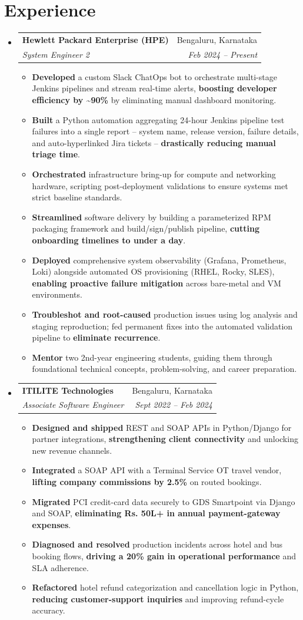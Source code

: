 \documentclass[a4paper,11pt]{article}
\makeatletter
\newcommand{\resumeItemWithoutTitle}[1]{
  \item\small{
    {#1 \vspace{-2pt}}
  }
}
\newcommand{\resumeSubheading}[4]{
  \vspace{-1pt}\item
    \begin{tabular*}{0.97\textwidth}{l@{\extracolsep{\fill}}r}
      \textbf{#1} & #2 \\
      \textit{#3} & \textit{#4} \\
    \end{tabular*}\vspace{-5pt}
}
\newcommand{\resumeSubHeadingListStart}{\begin{itemize}[leftmargin=*]}
\newcommand{\resumeSubHeadingListEnd}{\end{itemize}}
\newcommand{\resumeItemListStart}{\begin{itemize}}
\newcommand{\resumeItemListEnd}{\end{itemize}\vspace{-5pt}}
\makeatother
\begin{document}
\section{Experience}
  \resumeSubHeadingListStart
    \resumeSubheading
      {Hewlett Packard Enterprise (HPE)}{Bengaluru, Karnataka}
      {System Engineer 2}{Feb 2024 -- Present}
      \resumeItemListStart
        \resumeItemWithoutTitle{\textbf{Developed} a custom Slack ChatOps bot to orchestrate multi-stage Jenkins pipelines and stream real-time alerts, \textbf{boosting developer efficiency by \textasciitilde90\%} by eliminating manual dashboard monitoring.}
        \resumeItemWithoutTitle{\textbf{Built} a Python automation aggregating 24-hour Jenkins pipeline test failures into a single report -- system name, release version, failure details, and auto-hyperlinked Jira tickets -- \textbf{drastically reducing manual triage time}.}
        \resumeItemWithoutTitle{\textbf{Orchestrated} infrastructure bring-up for compute and networking hardware, scripting post-deployment validations to ensure systems met strict baseline standards.}
        \resumeItemWithoutTitle{\textbf{Streamlined} software delivery by building a parameterized RPM packaging framework and build/sign/publish pipeline, \textbf{cutting onboarding timelines to under a day}.}
        \resumeItemWithoutTitle{\textbf{Deployed} comprehensive system observability (Grafana, Prometheus, Loki) alongside automated OS provisioning (RHEL, Rocky, SLES), \textbf{enabling proactive failure mitigation} across bare-metal and VM environments.}
        \resumeItemWithoutTitle{\textbf{Troubleshot and root-caused} production issues using log analysis and staging reproduction; fed permanent fixes into the automated validation pipeline to \textbf{eliminate recurrence}.}
        \resumeItemWithoutTitle{\textbf{Mentor} two 2nd-year engineering students, guiding them through foundational technical concepts, problem-solving, and career preparation.}
      \resumeItemListEnd

    \resumeSubheading
      {ITILITE Technologies}{Bengaluru, Karnataka}
      {Associate Software Engineer}{Sept 2022 -- Feb 2024}
      \resumeItemListStart
        \resumeItemWithoutTitle{\textbf{Designed and shipped} REST and SOAP APIs in Python/Django for partner integrations, \textbf{strengthening client connectivity} and unlocking new revenue channels.}
        \resumeItemWithoutTitle{\textbf{Integrated} a SOAP API with a Terminal Service OT travel vendor, \textbf{lifting company commissions by 2.5\%} on routed bookings.}
        \resumeItemWithoutTitle{\textbf{Migrated} PCI credit-card data securely to GDS Smartpoint via Django and SOAP, \textbf{eliminating Rs. 50L+ in annual payment-gateway expenses}.}
        \resumeItemWithoutTitle{\textbf{Diagnosed and resolved} production incidents across hotel and bus booking flows, \textbf{driving a 20\% gain in operational performance} and SLA adherence.}
        \resumeItemWithoutTitle{\textbf{Refactored} hotel refund categorization and cancellation logic in Python, \textbf{reducing customer-support inquiries} and improving refund-cycle accuracy.}
      \resumeItemListEnd
  \resumeSubHeadingListEnd
\end{document}
